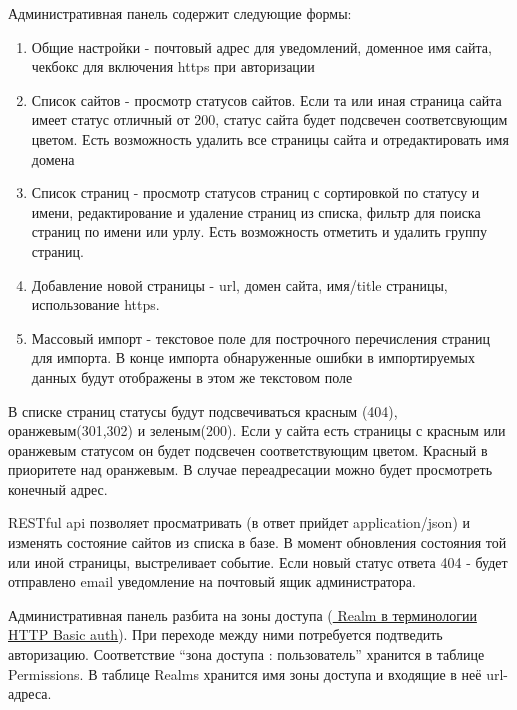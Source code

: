 \documentclass{scrreprt}
\begin{document}
Административная панель содержит следующие формы:
\begin{enumerate}
	\item Общие настройки - почтовый адрес для уведомлений, доменное имя сайта, чекбокс для включения https при авторизации
	\item Список сайтов - просмотр статусов сайтов. 
		Если та или иная страница сайта имеет статус отличный от 200, 
		статус сайта будет подсвечен соответсвующим цветом. 
		Есть возможность удалить все страницы сайта и отредактировать имя домена
	\item Список страниц - просмотр статусов страниц с сортировкой по статусу и имени, 
		редактирование и удаление страниц из списка, 
		фильтр для поиска страниц по имени или урлу.
		Есть возможность отметить и удалить группу страниц.
	\item Добавление новой страницы - url, домен сайта, имя/title страницы, использование https. 
	\item Массовый импорт - текстовое поле для построчного перечисления страниц для импорта. 
		В конце импорта обнаруженные ошибки в импортируемых данных будут отображены в этом же текстовом поле
\end{enumerate}

В списке страниц статусы будут подсвечиваться красным (404), оранжевым(301,302) и зеленым(200). 
Если у сайта есть страницы с красным или оранжевым статусом он будет подсвечен соответствующим цветом. Красный в приоритете над оранжевым.
В случае переадресации можно будет просмотреть конечный адрес.

RESTful api позволяет просматривать (в ответ прийдет application/json) и изменять состояние сайтов из списка в базе.
В момент обновления состояния той или иной страницы, выстреливает событие. Если новый статус ответа 404 - будет отправлено email уведомление на почтовый ящик администратора.

Административная панель разбита на зоны доступа (\href{https://tools.ietf.org/html/rfc7235#section-2.2}{ Realm в терминологии HTTP Basic auth}). При переходе между ними потребуется подтведить авторизацию. 
Соответствие ``зона доступа : пользователь'' хранится в таблице Permissions.
В таблице Realms хранится имя зоны доступа и входящие в неё url-адреса.
\end{document}

